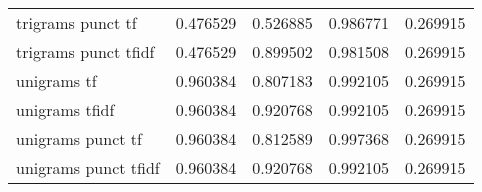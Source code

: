 \documentclass{article}
\begin{document}
\begin{table}
\begin{tabular}{lrrrr}
trigrams punct tf          &  0.476529 &     0.526885 &       0.986771 &             0.269915 \\
trigrams punct tfidf       &  0.476529 &     0.899502 &       0.981508 &             0.269915 \\
unigrams tf                &  0.960384 &     0.807183 &       0.992105 &             0.269915 \\
unigrams tfidf             &  0.960384 &     0.920768 &       0.992105 &             0.269915 \\
unigrams punct tf          &  0.960384 &     0.812589 &       0.997368 &             0.269915 \\
unigrams punct tfidf       &  0.960384 &     0.920768 &       0.992105 &             0.269915 \\
\bottomrule
\end{tabular}

\end{table}
\end{document}
